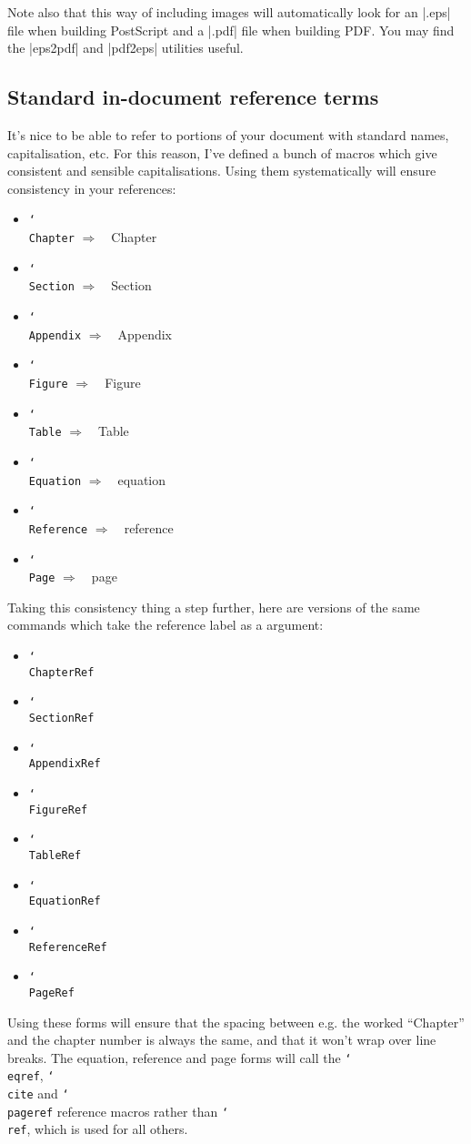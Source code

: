 \documentclass[12pt]{article}
\newcommand{\manifestsAs}{\texorpdfstring{\ensuremath{\Rightarrow\quad}\xspace}{->}}
\newcommand{\texcmd}[1]{\texorpdfstring{\texttt{\char`\\#1}}{#1}}
\begin{document}
Note also that this way of including images will automatically look for an
|.eps| file when building PostScript and a |.pdf| file when building PDF. You
may find the |eps2pdf| and |pdf2eps| utilities useful.

\subsection{Standard in-document reference terms}
It's nice to be able to refer to portions of your document with standard names,
capitalisation, etc. For this reason, I've defined a bunch of macros which give
consistent and sensible capitalisations. Using them systematically will ensure
consistency in your references:
%
\begin{itemize}
\item \texcmd{Chapter} \manifestsAs Chapter
\item \texcmd{Section} \manifestsAs Section
\item \texcmd{Appendix} \manifestsAs Appendix
\item \texcmd{Figure} \manifestsAs Figure
\item \texcmd{Table} \manifestsAs Table
\item \texcmd{Equation} \manifestsAs equation
\item \texcmd{Reference} \manifestsAs reference
\item \texcmd{Page} \manifestsAs page
\end{itemize}

Taking this consistency thing a step further, here are versions of the same
commands which take the reference label as a argument:
%
\begin{itemize}
\item \texcmd{ChapterRef}
\item \texcmd{SectionRef}
\item \texcmd{AppendixRef}
\item \texcmd{FigureRef}
\item \texcmd{TableRef}
\item \texcmd{EquationRef}
\item \texcmd{ReferenceRef}
\item \texcmd{PageRef}
\end{itemize}
%
Using these forms will ensure that the spacing between e.g. the worked
``Chapter'' and the chapter number is always the same, and that it won't wrap
over line breaks. The equation, reference and page forms will call the
\texcmd{eqref}, \texcmd{cite} and \texcmd{pageref} reference macros rather than
\texcmd{ref}, which is used for all others.
\end{document}
